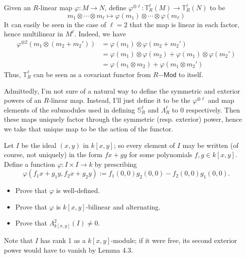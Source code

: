 \documentclass[../../master.tex]{subfiles}
\begin{document}
\begin{solution}
    Given an $R$-linear map $\varphi : M \to N$, define $\varphi^{\otimes \ell} : \mathbb{T}_R^{\ell}(M) \to \mathbb{T}_R^{\ell}(N)$ to be
    \[
    m_1 \otimes \cdots \otimes m_\ell \mapsto \varphi(m_1) \otimes \cdots \otimes \varphi(m_\ell)
    \]
    It can easily be seen in the case of $\ell = 2$ that the map is linear in each factor, hence multilinear in $M^{\ell}$.
    Indeed, we have
    \begin{align*}
        \varphi^{\otimes 2} (m_1 \otimes (m_2 + m_2')) &= \varphi(m_1) \otimes \varphi(m_2 + m_2') \\
                                                     &= \varphi(m_1) \otimes \varphi(m_2) + \varphi(m_1) \otimes \varphi(m_2') \\
                                                     &= \varphi(m_1 \otimes m_2) + \varphi(m_1 \otimes m_2')
    \end{align*}
    Thus, $\mathbb{T}_R^{\ell}$ can be seen as a covariant functor from $R\mathsf{-Mod}$ to itself.

    Admittedly, I'm not sure of a natural way to define the symmetric and exterior powers of an $R$-linear map.
    Instead, I'll just define it to be the $\varphi^{\otimes \ell}$ and map elements of the submodules used in defining $\mathbb{S}_R^{\ell}$ and $\Lambda_R^{\ell}$ to 0 respectively.
    Then these maps uniquely factor through the symmetric (resp. exterior) power, hence we take that unique map to be the action of the functor.
\end{solution}

\begin{problem}
    Let $I$ be the ideal $(x, y)$ in $k[x, y]$;
    so every element of $I$ may be written (of course, not uniquely) in the form $fx + gy$ for some polynomials $f, g \in k[x, y]$.
    Define a function $\varphi: I \times I \to k$ by prescribing
    \[
    \varphi(f_1 x + g_1 y, f_2x + g_2 y) := f_1(0, 0) g_2(0, 0) - f_2(0, 0) g_1(0, 0).
    \]
    \begin{itemize}
        \item Prove that $\varphi$ is well-defined.
        \item Prove that $\varphi$ is $k[x, y]$-bilinear and alternating.
        \item Prove that $\Lambda_{k[x, y]}^2(I) \neq 0$.
    \end{itemize}
    Note that $I$ has rank 1 as a $k[x, y]$-module;
    if it were free, its second exterior power would have to vanish by Lemma 4.3.
\end{problem}
\end{document}
